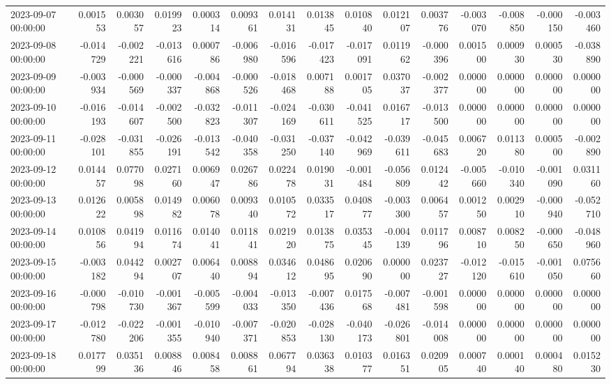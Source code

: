\begin{tabular}{lrrrrrrrrrrrrrr}
2023-09-07 00:00:00 & 0.001553 & 0.003057 & 0.019923 & 0.000314 & 0.009361 & 0.014131 & 0.013845 & 0.010840 & 0.012107 & 0.003776 & -0.003070 & -0.008850 & -0.000150 & -0.003460 \\
2023-09-08 00:00:00 & -0.014729 & -0.002221 & -0.013616 & 0.000786 & -0.006980 & -0.016596 & -0.017423 & -0.017091 & 0.011962 & -0.000396 & 0.001500 & 0.000930 & 0.000530 & -0.038890 \\
2023-09-09 00:00:00 & -0.003934 & -0.000569 & -0.000337 & -0.004868 & -0.000526 & -0.018468 & 0.007188 & 0.001705 & 0.037037 & -0.002377 & 0.000000 & 0.000000 & 0.000000 & 0.000000 \\
2023-09-10 00:00:00 & -0.016193 & -0.014607 & -0.002500 & -0.032823 & -0.011307 & -0.024169 & -0.030611 & -0.041525 & 0.016717 & -0.013500 & 0.000000 & 0.000000 & 0.000000 & 0.000000 \\
2023-09-11 00:00:00 & -0.028101 & -0.031855 & -0.026191 & -0.013542 & -0.040358 & -0.031250 & -0.037140 & -0.042969 & -0.039611 & -0.045683 & 0.006720 & 0.011380 & 0.000500 & -0.002890 \\
2023-09-12 00:00:00 & 0.014457 & 0.077098 & 0.027160 & 0.006947 & 0.026786 & 0.022478 & 0.019031 & -0.001484 & -0.056809 & 0.012442 & -0.005660 & -0.010340 & -0.001090 & 0.031160 \\
2023-09-13 00:00:00 & 0.012622 & 0.005898 & 0.014982 & 0.006078 & 0.009340 & 0.010572 & 0.033517 & 0.040877 & -0.003300 & 0.006457 & 0.001250 & 0.002910 & -0.000940 & -0.052710 \\
2023-09-14 00:00:00 & 0.010856 & 0.041994 & 0.011674 & 0.014041 & 0.011841 & 0.021920 & 0.013875 & 0.035345 & -0.004139 & 0.011796 & 0.008710 & 0.008250 & -0.000650 & -0.048960 \\
2023-09-15 00:00:00 & -0.003182 & 0.044294 & 0.002707 & 0.006440 & 0.008894 & 0.034612 & 0.048695 & 0.020690 & 0.000000 & 0.023727 & -0.012120 & -0.015610 & -0.001050 & 0.075660 \\
2023-09-16 00:00:00 & -0.000798 & -0.010730 & -0.001367 & -0.005599 & -0.004033 & -0.013350 & -0.007436 & 0.017568 & -0.007481 & -0.001598 & 0.000000 & 0.000000 & 0.000000 & 0.000000 \\
2023-09-17 00:00:00 & -0.012780 & -0.022206 & -0.001355 & -0.010940 & -0.007371 & -0.020853 & -0.028130 & -0.040173 & -0.026801 & -0.014008 & 0.000000 & 0.000000 & 0.000000 & 0.000000 \\
2023-09-18 00:00:00 & 0.017799 & 0.035136 & 0.008846 & 0.008458 & 0.008861 & 0.067794 & 0.036338 & 0.010377 & 0.016351 & 0.020905 & 0.000740 & 0.000140 & 0.000480 & 0.015230 \\

\end{tabular}
